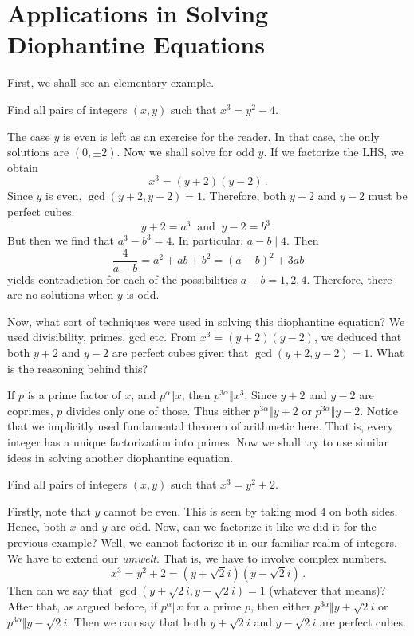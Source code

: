 \documentclass[11pt]{scrartcl}
\begin{document}
\section{Applications in Solving Diophantine Equations}
First, we shall see an elementary example.
\begin{exercise}
Find all pairs of integers \(\left(x,y\right) \) such that \(x^3 = y^2 - 4\).
\end{exercise}
\begin{soln}
The case \(y\) is even is left as an exercise for the reader. In that case, the only solutions are \(\left(0, \pm 2\right) \). Now we shall solve for odd \(y\). If we factorize the LHS, we obtain
\[ x^3 = \left(y+2\right) \left(y-2\right) \,. \]
Since \(y\) is even, \(\gcd\left(y+2 , y-2\right) =1 \). Therefore, both \(y+2\) and \(y-2\) must be perfect cubes.
\[ y+2 = a^3 \ \text{ and } \ y-2 = b^3 \,. \]
But then we find that \(a^3 - b^3 = 4\). In particular, \(a-b \mid 4\). Then
\[ \frac{4}{a-b} = a^2 + ab + b^2 = (a-b)^2+3ab  \]
yields contradiction for each of the possibilities \(a-b = 1,2,4\). Therefore, there are no solutions when \(y\) is odd.
\end{soln}
Now, what sort of techniques were used in solving this diophantine equation? We used divisibility, primes, gcd etc. From \(x^3 =  \left(y+2\right) \left(y-2\right)  \), we deduced that both \(y+2\) and \(y-2\) are perfect cubes given that \(\gcd\left(y+2 , y-2\right) =1 \). What is the reasoning behind this?

If \(p\) is a prime factor of \(x\), and %
\(p^\alpha \Vert x\), then \(p^{3\alpha} \Vert x^3\). Since \(y+2\) and \(y-2\) are coprimes, \(p\) divides only one of those. Thus either \(p^{3\alpha} \Vert y+2\) or \(p^{3\alpha} \Vert y-2\). Notice that we implicitly used fundamental theorem of arithmetic here. That is, every integer has a unique factorization into primes. Now we shall try to use similar ideas in solving another diophantine equation.
\begin{exercise}
Find all pairs of integers \(\left(x,y\right) \) such that \(x^3 = y^2 +2\).
\end{exercise}
Firstly, note that \(y\) cannot be even. This is seen by taking mod \( 4\) on both sides. Hence, both \(x\) and \(y\) are odd. Now, can we factorize it like we did it for the previous example? Well, we cannot factorize it in our familiar realm of integers. We have to extend our \textit{umwelt}. %
That is, we have to involve complex numbers.
\[ x^3 = y^2 +2 = \left(y + \sqrt 2 i\right) \left(y - \sqrt 2 i\right) \,. \]
Then can we say that \(\gcd \left( y + \sqrt 2 i , y - \sqrt 2 i \right) =1 \) (whatever that means)? After that, as argued before, if \(p^{\alpha} \Vert x\) for a prime \(p\), then either \(p^{3\alpha}\Vert y + \sqrt 2 i\) or \(p^{3\alpha}\Vert y - \sqrt 2 i\). Then we can say that both \(y + \sqrt 2 i\) and \(y - \sqrt 2 i\) are perfect cubes.
\end{document}
